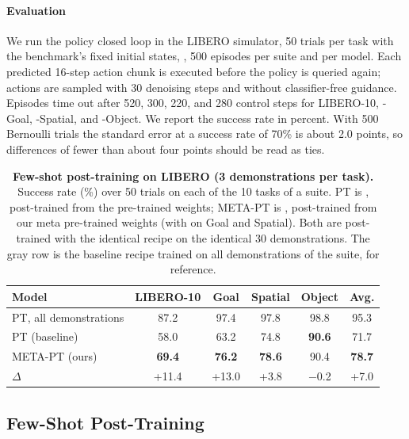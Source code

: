 \paragraph{Evaluation}
We run the policy closed loop in the LIBERO simulator, 50 trials per task with the benchmark's fixed initial states, \ie, 500 episodes per suite and per model.
Each predicted 16-step action chunk is executed before the policy is queried again; actions are sampled with 30 denoising steps and without classifier-free guidance.
Episodes time out after 520, 300, 220, and 280 control steps for LIBERO-10, -Goal, -Spatial, and -Object.
We report the success rate in percent.
With 500 Bernoulli trials the standard error at a success rate of 70\% is about 2.0 points, so differences of fewer than about four points should be read as ties.

\begin{table}[t]
  \centering
  \footnotesize
  \setlength{\tabcolsep}{3.2pt}
  \begin{tabular}{lccccc}
    \toprule
    Model & LIBERO-10 & Goal & Spatial & Object & Avg. \\
    \midrule
    \textcolor{black!55}{PT, all demonstrations} & \textcolor{black!55}{87.2} & \textcolor{black!55}{97.4} & \textcolor{black!55}{97.8} & \textcolor{black!55}{98.8} & \textcolor{black!55}{95.3} \\
    \midrule
    PT (baseline) & 58.0 & 63.2 & 74.8 & \textbf{90.6} & 71.7 \\
    META-PT (ours) & \textbf{69.4} & \textbf{76.2} & \textbf{78.6} & 90.4 & \textbf{78.7} \\
    \midrule
    $\Delta$ & +11.4 & +13.0 & +3.8 & $-$0.2 & +7.0 \\
    \bottomrule
  \end{tabular}
  \caption{\textbf{Few-shot post-training on LIBERO (3 demonstrations per task).}
  Success rate (\%) over 50 trials on each of the 10 tasks of a suite.
  PT is \basept, post-trained from the pre-trained weights; META-PT is \metapt, post-trained from our meta pre-trained weights (with \RPL on Goal and Spatial).
  Both are post-trained with the identical recipe on the identical 30 demonstrations.
  The gray row is the baseline recipe trained on all demonstrations of the suite, for reference.}
  \label{tab:main}
\end{table}

\subsection{Few-Shot Post-Training}
\label{sec:exp_main}

